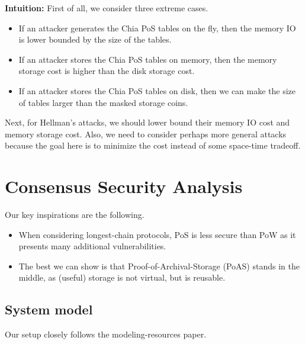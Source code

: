 \documentclass[12pt,draftcls,onecolumn]{IEEEtran}
\begin{document}
{\bf Intuition:} First of all, we consider three extreme cases.
\begin{itemize}
    \item If an attacker generates the Chia PoS tables on the fly, then the memory IO is lower bounded by the size of the tables.
    \item If an attacker stores the Chia PoS tables on memory, then the memory storage cost is higher than the disk storage cost.
    \item If an attacker stores the Chia PoS tables on disk, then we can make the size of tables larger than the masked storage coins.
\end{itemize}

Next, for Hellman's attacks, we should lower bound their memory IO cost and memory storage cost.
Also, we need to consider perhaps more general attacks because the goal here is to minimize the cost instead of some space-time tradeoff.

\section{Consensus Security Analysis}

Our key inspirations are the following.

\begin{itemize}
    \item When considering longest-chain protocols, PoS is less secure than PoW as it presents many additional vulnerabilities. 
    \item The best we can show is that Proof-of-Archival-Storage (PoAS) stands in the middle, as (useful) storage is not virtual, but is reusable.
\end{itemize}

\subsection{System model}







Our setup closely follows the modeling-resources paper.

\end{document}
